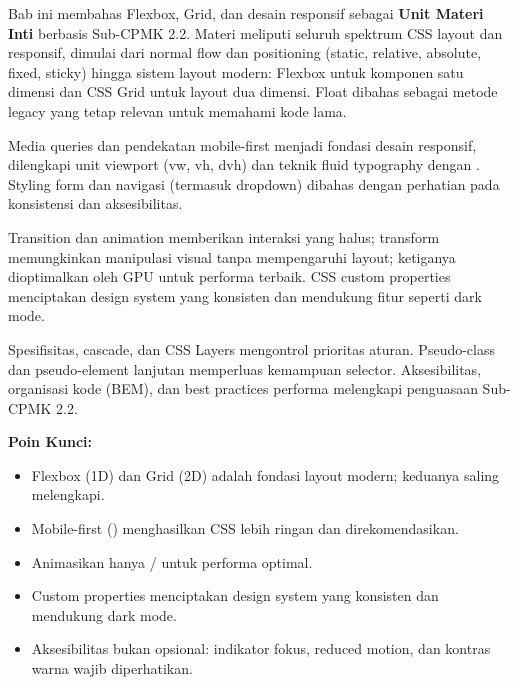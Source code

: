 \documentclass[../main.tex]{subfiles}
\begin{document}
\begin{rangkuman}
Bab ini membahas Flexbox, Grid, dan desain responsif sebagai \textbf{Unit Materi Inti} berbasis Sub-CPMK 2.2. Materi meliputi seluruh spektrum CSS layout dan responsif, dimulai dari normal flow dan positioning (static, relative, absolute, fixed, sticky) hingga sistem layout modern: Flexbox untuk komponen satu dimensi dan CSS Grid untuk layout dua dimensi. Float dibahas sebagai metode legacy yang tetap relevan untuk memahami kode lama.

Media queries dan pendekatan mobile-first menjadi fondasi desain responsif, dilengkapi unit viewport (vw, vh, dvh) dan teknik fluid typography dengan . Styling form dan navigasi (termasuk dropdown) dibahas dengan perhatian pada konsistensi dan aksesibilitas.

Transition dan animation memberikan interaksi yang halus; transform memungkinkan manipulasi visual tanpa mempengaruhi layout; ketiganya dioptimalkan oleh GPU untuk performa terbaik. CSS custom properties menciptakan design system yang konsisten dan mendukung fitur seperti dark mode.

Spesifisitas, cascade, dan CSS Layers mengontrol prioritas aturan. Pseudo-class dan pseudo-element lanjutan memperluas kemampuan selector. Aksesibilitas, organisasi kode (BEM), dan best practices performa melengkapi penguasaan Sub-CPMK 2.2.

\textbf{Poin Kunci:}
\begin{itemize}
  \item Flexbox (1D) dan Grid (2D) adalah fondasi layout modern; keduanya saling melengkapi.
  \item Mobile-first () menghasilkan CSS lebih ringan dan direkomendasikan.
  \item Animasikan hanya / untuk performa optimal.
  \item Custom properties menciptakan design system yang konsisten dan mendukung dark mode.
  \item Aksesibilitas bukan opsional: indikator fokus, reduced motion, dan kontras warna wajib diperhatikan.
\end{itemize}
\end{rangkuman}

\ifSubfilesClassLoaded{
  \renewcommand{\bibname}{Daftar Pustaka}
  
  
}{}
\end{document}
